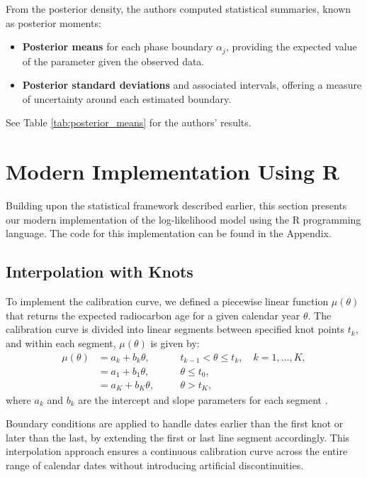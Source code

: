 \documentclass{article}
\begin{document}

From the posterior density, the authors computed statistical summaries, known as posterior moments:
\begin{itemize}
    \item \textbf{Posterior means} for each phase boundary $\alpha_j$, providing the expected value of the parameter given the observed data.
    \item \textbf{Posterior standard deviations} and associated intervals, offering a measure of uncertainty around each estimated boundary.
\end{itemize}
See Table \ref{tab:posterior_means} for the authors' results.


\section{Modern Implementation Using R}
Building upon the statistical framework described earlier, this section presents our modern implementation of the log-likelihood model using the R programming language. The code for this implementation can be found in the Appendix.
\subsection{Interpolation with Knots}
To implement the calibration curve, we defined a piecewise linear function $\mu(\theta)$ that returns the expected radiocarbon age for a given calendar year $\theta$. The calibration curve is divided into linear segments between specified knot points $t_k$, and within each segment, $\mu(\theta)$ is given by:
\begin{align*}
\mu(\theta) &= a_k + b_k \theta, &\quad & t_{k-1} < \theta \leq t_k, \quad k = 1, \dots, K, \\
           &= a_1 + b_1 \theta, &\quad & \theta \leq t_0, \\
           &= a_K + b_K \theta, &\quad & \theta > t_K,
\end{align*}
where $a_k$ and $b_k$ are the intercept and slope parameters for each segment \cite{thepaper}. 

Boundary conditions are applied to handle dates earlier than the first knot or later than the last, by extending the first or last line segment accordingly. This interpolation approach ensures a continuous calibration curve across the entire range of calendar dates without introducing artificial discontinuities.
\end{document}

